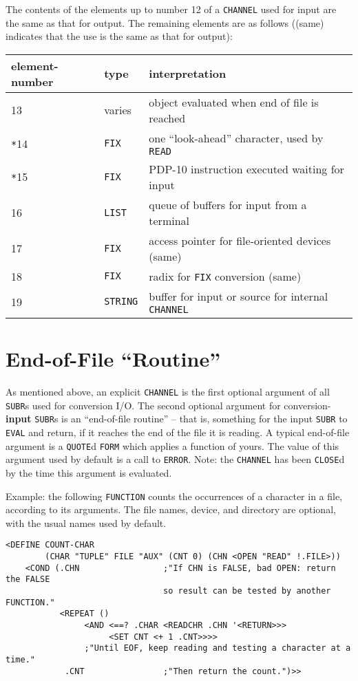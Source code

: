 \documentclass[a4paper]{scrbook}
\begin{document}
The contents of the elements up to number 12 of a \texttt{CHANNEL} used for input are the same as that for output. The
remaining elements are as follows ((same) indicates that the use is the same as that for output):

\begin{longtable}[]{@{}lll@{}}
\toprule
element-number & type & interpretation\tabularnewline
\midrule
\endhead
13 & varies & object evaluated when end of file is reached\tabularnewline
\texttt{*}14 & \texttt{FIX} & one ``look-ahead'' character, used by \texttt{READ}\tabularnewline
\texttt{*}15 & \texttt{FIX} & PDP-10 instruction executed waiting for input\tabularnewline
16 & \texttt{LIST} & queue of buffers for input from a terminal\tabularnewline
17 & \texttt{FIX} & access pointer for file-oriented devices (same)\tabularnewline
18 & \texttt{FIX} & radix for \texttt{FIX} conversion (same)\tabularnewline
19 & \texttt{STRING} & buffer for input or source for internal \texttt{CHANNEL}\tabularnewline
\bottomrule
\end{longtable}

\section{\texorpdfstring{End-of-File ``Routine''}{11.3. End-of-File Routine}}\label{end-of-file-routine}

As mentioned above, an explicit \texttt{CHANNEL} is the first optional argument of all \texttt{SUBR}s used for conversion
I/O. The second optional argument for conversion-\textbf{input} \texttt{SUBR}s is an ``end-of-file routine'' -- that is,
something for the input \texttt{SUBR} to \texttt{EVAL} and return, if it reaches the end of the file it is reading. A
typical end-of-file argument is a \texttt{QUOTE}d \texttt{FORM} which applies a function of yours. The value of this
argument used by default is a call to \texttt{ERROR}. Note: the \texttt{CHANNEL} has been \texttt{CLOSE}d by the time this
argument is evaluated.

Example: the following \texttt{FUNCTION} counts the occurrences of a character in a file, according to its arguments. The
file names, device, and directory are optional, with the usual names used by default. 
   

\begin{verbatim}
<DEFINE COUNT-CHAR
        (CHAR "TUPLE" FILE "AUX" (CNT 0) (CHN <OPEN "READ" !.FILE>))
    <COND (.CHN                 ;"If CHN is FALSE, bad OPEN: return the FALSE
                                so result can be tested by another FUNCTION."
           <REPEAT ()
                <AND <==? .CHAR <READCHR .CHN '<RETURN>>>
                     <SET CNT <+ 1 .CNT>>>>
                ;"Until EOF, keep reading and testing a character at a time."
            .CNT                ;"Then return the count.")>>
\end{verbatim}
\end{document}
